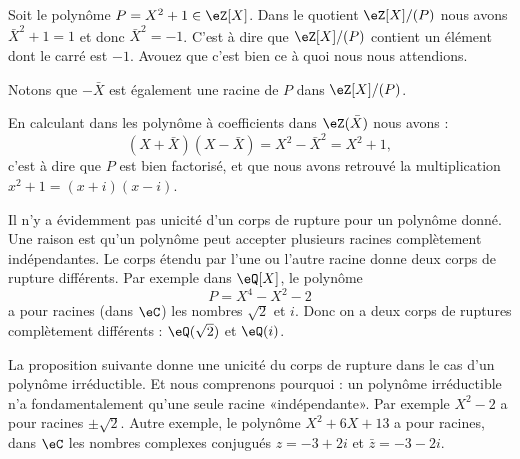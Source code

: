 \begin{example}
    Soit le polynôme \( P=X^2+1\in \eZ[X]\). Dans le quotient \( \eZ[X]/(P)\) nous avons \( \bar X^2+1=1\) et donc \( \bar X^2=-1\). C'est à dire que \( \eZ[X]/(P)\) contient un élément dont le carré est \( -1\). Avouez que c'est bien ce à quoi nous nous attendions.

    Notons que \( -\bar X\) est également une racine de \( P\) dans \( \eZ[X]/(P)\).

    En calculant dans les polynôme à coefficients dans \( \eZ(\bar X)\) nous avons :
    \begin{equation}
        (X+\bar X)(X-\bar X)=X^2-\bar X^2=X^2+1,
    \end{equation}
    c'est à dire que \( P\) est bien factorisé, et que nous avons retrouvé la multiplication \( x^2+1=(x+i)(x-i)\).
\end{example}

\begin{normaltext}
    Il n'y a évidemment pas unicité d'un corps de rupture pour un polynôme donné. Une raison est qu'un polynôme peut accepter plusieurs racines complètement indépendantes. Le corps étendu par l'une ou l'autre racine donne deux corps de rupture différents. Par exemple dans \( \eQ[X]\), le polynôme
    \begin{equation}
        P=X^4-X^2-2
    \end{equation}
    a pour racines (dans \( \eC\)) les nombres \( \sqrt{ 2 }\) et \( i\). Donc on a deux corps de ruptures complètement différents : \( \eQ(\sqrt{ 2 })\) et \( \eQ(i)\).
\end{normaltext}

\begin{normaltext}
    La proposition suivante donne une unicité du corps de rupture dans le cas d'un polynôme irréductible. Et nous comprenons pourquoi : un polynôme irréductible n'a fondamentalement qu'une seule racine «indépendante». Par exemple \( X^2-2\) a pour racines \( \pm\sqrt{ 2 }\). Autre exemple, le polynôme \( X^2+6X+13\) a pour racines, dans \( \eC\) les nombres complexes conjugués \( z=-3+2i\) et \( \bar z=-3-2i\).
\end{normaltext}

